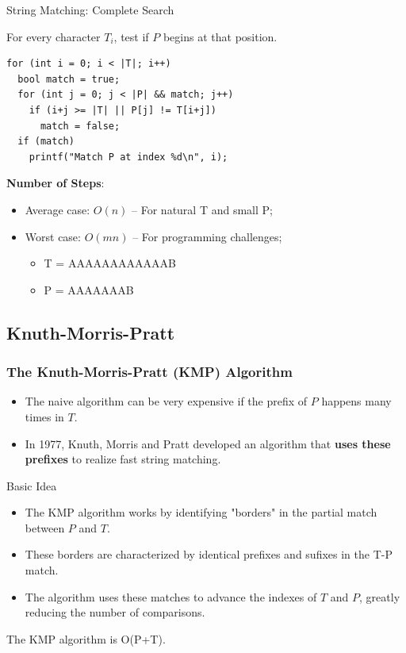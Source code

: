 \begin{frame}[fragile]{String Matching: Complete Search}

  For every character $T_i$, test if $P$ begins at that position.\bigskip

\begin{verbatim}
for (int i = 0; i < |T|; i++)
  bool match = true;
  for (int j = 0; j < |P| && match; j++)
    if (i+j >= |T| || P[j] != T[i+j])
      match = false;
  if (match)
    printf("Match P at index %d\n", i);
\end{verbatim}

{\bf Number of Steps}:
  \begin{itemize}
    \item Average case: $O(n)$ -- For natural T and small P;
    \item Worst case: $O(mn)$ -- For programming challenges;
    \begin{itemize}
      \item T = AAAAAAAAAAAAB
      \item P = AAAAAAAB
    \end{itemize}
  \end{itemize}
\end{frame}

\subsection{Knuth-Morris-Pratt}
\begin{frame}[fragile]
  \frametitle{The Knuth-Morris-Pratt (KMP) Algorithm}

  \begin{itemize}
    \item The naive algorithm can be very expensive if the prefix of $P$ happens many times in $T$.
    \item In 1977, Knuth, Morris and Pratt developed an algorithm that {\bf uses these prefixes} to realize fast string matching.
  \end{itemize}

  \begin{block}{Basic Idea}
    \begin{itemize}
    \item The KMP algorithm works by identifying "borders" in the partial match between $P$ and $T$.
    \item These borders are characterized by identical prefixes and sufixes in the T-P match.
    \item The algorithm uses these matches to advance the indexes of $T$ and $P$, greatly reducing the number of comparisons.
  \end{itemize}
  \end{block}
  The KMP algorithm is O(P+T).
\end{frame}

